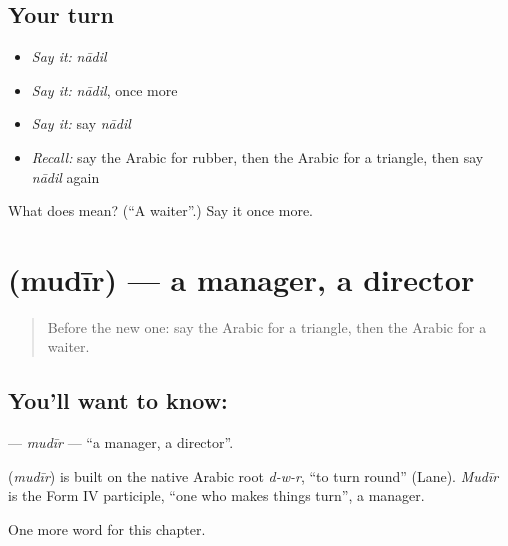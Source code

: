 \subsection*{Your turn}
\begin{itemize}
\raggedright
  \item \emph{Say it:} \emph{nādil}
  \item \emph{Say it:} \emph{nādil}, once more
  \item \emph{Say it:} say \emph{nādil}
  \item \emph{Recall:} say the Arabic for rubber, then the Arabic for a triangle, then say \emph{nādil} again
\end{itemize}

\begin{tcolorbox}[breakable,colback=teal!4,colframe=teal!35!black,title={Before you move on}]
What does  mean? (\textquotedblleft{}A waiter\textquotedblright{}.) Say it once more.
\end{tcolorbox}
\section[\texorpdfstring{\ar{مدير} (mudīr)}{مدير (mudīr)}]{ (mudīr) — a manager, a director}

\label{lesson:AR-C251-mudir}



\begin{quote}
Before the new one: say the Arabic for a triangle, then the Arabic for a waiter.
\end{quote}

\subsection*{You'll want to know: }
\textbf{} — \emph{mudīr} — \textquotedblleft{}a manager, a director\textquotedblright{}.

\begin{cousinweb}
\textbf{} (\emph{mudīr}) is built on the native Arabic root \emph{d-w-r}, \textquotedblleft{}to turn round\textquotedblright{} (Lane). \emph{Mudīr} is the Form IV participle, \textquotedblleft{}one who makes things turn\textquotedblright{}, a manager.
\end{cousinweb}

\begin{grammarlens}[title={What you've built}]
One more word for this chapter.
\end{grammarlens}

